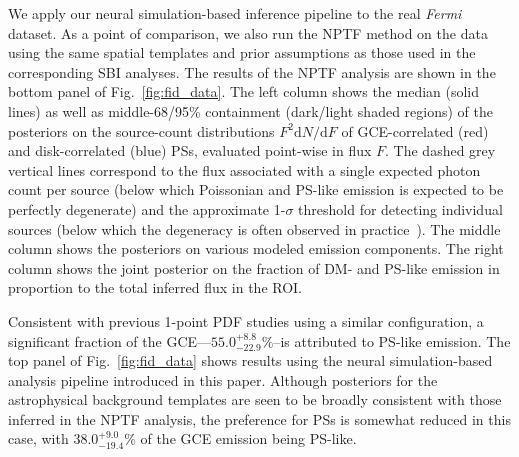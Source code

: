 \documentclass[]{article}
\newcommand{\Fermi}{\emph{Fermi}\xspace}
\newcommand{\dd}{\mathrm{d}}
\begin{document}
We apply our neural simulation-based inference pipeline to the real \Fermi dataset. As a point of comparison, we also run the NPTF method on the data using the same spatial templates and prior assumptions as those used in the corresponding SBI analyses. 
The results of the NPTF analysis are shown in the bottom panel of Fig.~\ref{fig:fid_data}. The left column shows the median (solid lines) as well as middle-68/95\% containment (dark/light shaded regions) of the posteriors on the source-count distributions $F^2 \dd N/\dd F$ of GCE-correlated (red) and disk-correlated (blue) PSs, evaluated point-wise in flux $F$. The dashed grey vertical lines correspond to the flux associated with a single expected photon count per source (below which Poissonian and PS-like emission is expected to be perfectly degenerate) and the approximate 1-$\sigma$ threshold for detecting individual sources (below which the degeneracy is often observed in practice~\cite{Chang:2019ars,Buschmann:2020adf}). The middle column shows the posteriors on various modeled emission components.
The right column shows the joint posterior on the fraction of DM- and PS-like emission in proportion to the total inferred flux in the ROI.

Consistent with previous 1-point PDF studies using a similar configuration, a significant fraction of the GCE---$55.0^{+8.8}_{-22.9}\%$--is attributed to PS-like emission.
The top panel of Fig.~\ref{fig:fid_data} shows results using the neural simulation-based analysis pipeline introduced in this paper. Although posteriors for the astrophysical background templates are seen to be broadly consistent with those inferred in the NPTF analysis, the preference for PSs is somewhat reduced in this case, with $38.0^{+9.0}_{-19.4}\%$ of the GCE emission being PS-like. 

\end{document}
